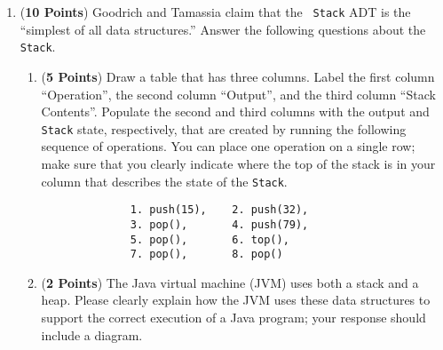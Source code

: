 \documentclass[12pt]{article}
\begin{document}
\begin{enumerate}
        \newpage

      \item ({\bf 10 Points}) Goodrich and Tamassia claim that the {\tt
          Stack} ADT is the ``simplest of all data structures.''  Answer the
        following questions about the {\tt Stack}.

        \begin{enumerate}

          \item ({\bf 5 Points}) Draw a table that has three columns.  Label the first column ``Operation'', the second
            column ``Output'', and the third column ``Stack Contents''.  Populate the second and third columns with the
            output and {\tt Stack} state, respectively, that are created by running the following sequence of
            operations.  You can place one operation on a single row; make sure that you clearly indicate where the top
            of the stack is in your column that describes the state of the {\tt Stack}.

            \begin{verbatim} 
              1. push(15),    2. push(32), 
              3. pop(),       4. push(79),
              5. pop(),       6. top(), 
              7. pop(),       8. pop() 
            \end{verbatim}

            \vspace*{-.3in}

          \item ({\bf 2 Points}) The Java virtual machine (JVM) uses both a stack and a heap.  Please clearly explain
            how the JVM uses these data structures to support the correct execution of a Java program; your response
            should include a diagram.




\end{enumerate}
\end{enumerate}
\end{document}
